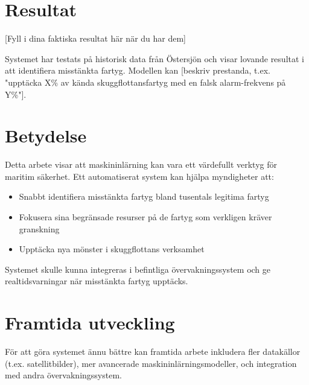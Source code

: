 \section*{Resultat}
[Fyll i dina faktiska resultat här när du har dem]

Systemet har testats på historisk data från Östersjön och visar lovande resultat i att identifiera misstänkta fartyg. Modellen kan [beskriv prestanda, t.ex. "upptäcka X\% av kända skuggflottansfartyg med en falsk alarm-frekvens på Y\%"].

\section*{Betydelse}
Detta arbete visar att maskininlärning kan vara ett värdefullt verktyg för maritim säkerhet. Ett automatiserat system kan hjälpa myndigheter att:
\begin{itemize}
    \item Snabbt identifiera misstänkta fartyg bland tusentals legitima fartyg
    \item Fokusera sina begränsade resurser på de fartyg som verkligen kräver granskning
    \item Upptäcka nya mönster i skuggflottans verksamhet
\end{itemize}

Systemet skulle kunna integreras i befintliga övervakningssystem och ge realtidsvarningar när misstänkta fartyg upptäcks.

\section*{Framtida utveckling}
För att göra systemet ännu bättre kan framtida arbete inkludera fler datakällor (t.ex. satellitbilder), mer avancerade maskininlärningsmodeller, och integration med andra övervakningssystem.
